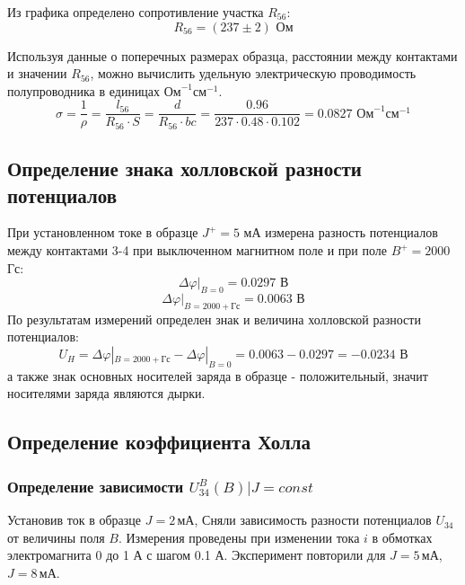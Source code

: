Из графика определено сопротивление участка $R_{56}$:
\begin{equation}
	R_{56}=(237\pm 2) \text{ Ом}
\end{equation}

Используя данные о поперечных размерах образца, расстоянии между контактами и значении $R_{56}$, можно вычислить удельную электрическую проводимость полупроводника в единицах $\text{Ом}^{-1}\text{см}^{-1}$.
\begin{equation}
	\sigma=\frac{1}{\rho} =\frac{l_{56}}{R_{56} \cdot S}=\frac{d}{R_{56}\cdot bc}=\frac{0.96}{237\cdot 0.48\cdot 0.102}=0.0827 \text{ Ом}^{-1}\text{см}^{-1}
\end{equation}

\subsection{Определение знака холловской разности потенциалов}

При установленном токе в образце $J^{+}=5$ мА измерена разность потенциалов между
контактами 3-4 при выключенном магнитном поле и при поле $B^{+}=2000$ Гс:
\begin{equation}
	\Delta\varphi|_{B=0}=0.0297 \text{ В}
\end{equation}
\begin{equation}
	\Delta\varphi|_{B=2000+ \text{Гс}}=0.0063 \text{ В}
\end{equation}
По результатам измерений определен знак и величина холловской разности потенциалов:
\begin{equation}
	U_H=\Delta\varphi|_{B=2000+ \text{Гс}}-\Delta\varphi|_{B=0}=0.0063-0.0297=-0.0234 \text{ В}
\end{equation}
а также знак основных носителей заряда в образце - положительный, значит носителями заряда являются дырки.

\subsection{Определение коэффициента Холла}
\subsubsection{Определение зависимости $U^B_{34}(B)|{J=const}$}
Установив ток в образце ${J=2\,\text{мА}}$, Сняли зависимость разности потенциалов $U_{34}$ от величины поля $B$. Измерения проведены  при изменении тока $i$ в обмотках электромагнита 0 до 1 А с шагом 0.1 А. Эксперимент повторили для ${J=5\,\text{мА}}$, ${J=8\,\text{мА}}$.

